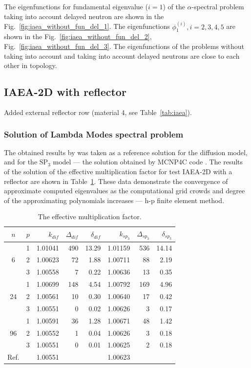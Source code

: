 \documentclass[authoryear]{elsarticle}
\begin{document}
The eigenfunctions for fundamental eigenvalue ($i=1$) of the $\alpha$-spectral problem taking into account delayed neutron are shown in the Fig.~\ref{fig:iaea_without_fun_del_1}. 
The eigenfunctions $\phi_1^{(i)}, i=2,3,4,5$ are shown in the Fig.~\ref{fig:iaea_without_fun_del_2}, Fig.~\ref{fig:iaea_without_fun_del_3}.
The eigenfunctions of the problems without taking into account and taking into account delayed neutrons are close to each other in topology.

\subsection{IAEA-2D with reflector}
Added external reflector row (material 4, see Table~\ref{tab:iaea}). 

\subsubsection{Solution of Lambda Modes spectral problem}
The obtained results by \citep{avvakumov2015} was taken as a reference solution for the diffusion model, and for the $\mathrm{SP_3}$ model ---  the solution obtained by MCNP4C code \citep{ryu2010development}.
The results of the solution of the effective multiplication factor for test IAEA-2D with a reflector are shown in Table~\ref{tab:iaea_with_lambda}. 
These data demonstrate the convergence of approximate computed eigenvalues as the computational grid crowds and degree of the approximating polynomials increases --- h-p finite element method.

\begin{table}[h]
\caption{The effective multiplication factor.}
\label{tab:iaea_with_lambda}
\begin{center}
\begin{tabular}{c c r r r r r r}
\hline
$n$ & $p$ & $k_{dif}$ & $\Delta_{dif}$ & $\delta_{dif}$ &$k_{sp_3}$& $\Delta_{sp_3}$ & $\delta_{sp_3}$ \\
\hline
	& 1	& 1.01041& 490&13.29& 1.01159& 536& 14.14\\
6	& 2	& 1.00623&  72& 1.88& 1.00711&  88&  2.19\\
	& 3	& 1.00558&   7& 0.22& 1.00636&  13&  0.35\\ 
\hline
	& 1	& 1.00699& 148& 4.54& 1.00792& 169&  4.96\\
24& 2	& 1.00561&  10& 0.30& 1.00640&  17&  0.42\\
	& 3	& 1.00551&   0& 0.02& 1.00626&   3&  0.17\\ 
\hline
	& 1	& 1.00591&  36& 1.28& 1.00671&  48&  1.42\\
96& 2	& 1.00552&   1& 0.04& 1.00626&   3&  0.18\\
	& 3	& 1.00551&   0& 0.01& 1.00625&   2&  0.18\\ 
\hline
Ref.&   & 1.00551&    &     & 1.00623&     &\\ 
\hline
\end{tabular}
\end{center}
\end{table}
\end{document}
